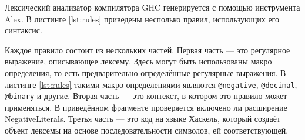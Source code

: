 Лексический анализатор компилятора GHC генерируется с помощью инструмента
Alex. В листинге \ref{lst:rules} приведены несполько правил, использующих
его синтаксис.

Каждое правило состоит из нескольких частей. Первая часть --- это регулярное
выражение, описывающее лексему. Здесь могут быть использованы макро
определения, то есть предварительно определённые регулярные выражения.  В
листинге \ref{lst:rules} такими макро определениями являются
\texttt{@negative}, \texttt{@decimal}, \texttt{@binary} и другие. Вторая часть
--- это контекст, в котором это правило может применяться. В приведённом
фрагменте проверяется включено ли расширение NegativeLiterals. Третья часть ---
это код на языке Хаскель, который создаёт объект лексемы на основе
последовательности символов, ей соответствующей.
